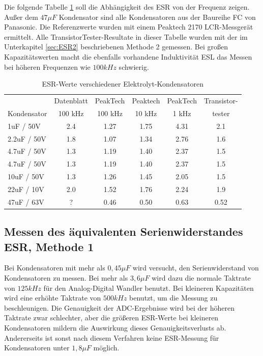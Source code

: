 Die folgende Tabelle \ref{tab:capESR} soll die Abhängigkeit des ESR von der Frequenz zeigen.
Außer dem \(47\mu F\) Kondensator sind alle Kondensatoren aus der Baureihe FC von Panasonic.
Die Referenzwerte wurden mit einem Peaktech 2170 LCR-Messgerät ermittelt.
Alle TransistorTester-Resultate in dieser Tabelle wurden mit der im Unterkapitel \ref{sec:ESR2} 
beschriebenen Methode 2 gemessen.
Bei großen Kapazitätswerten macht die ebenfalls vorhandene Induktivität ESL das Messen bei höheren Frequenzen 
wie \(100kHz\) schwierig.


\begin{table}[H]
  \begin{center}
    \begin{tabular}{| l | c | c | c | c | c |}
   \hline
            & Datenblatt & PeakTech  & Peaktech & PeakTech & Transistor- \\
Kondensator & 100 kHz    & 100 kHz   & 10 kHz   & 1 kHz    & tester  \\
    \hline
    \hline
1uF / 50V    & 2.4       & 1.27      & 1.75     & 4.31     &  2.1 \\
    \hline
2.2uF / 50V  & 1.8       & 1.07      & 1.34     & 2.76     &  1.6 \\
    \hline
4.7uF / 50V  & 1.3       & 1.19      & 1.40     & 2.37     &  1.5 \\
    \hline
4.7uF / 50V  & 1.3       & 1.19      & 1.40     & 2.37     &  1.5 \\
    \hline
10uF / 50V   & 1.3       & 1.26      & 1.45     & 2.05     &  1.5 \\
    \hline
22uF / 10V   & 2.0       & 1.52      & 1.76     & 2.24     &  1.9 \\
    \hline
47uF / 63V   & ?         & 0.46      & 0.50     & 0.63     &  0.52 \\
    \hline
    \end{tabular}
  \end{center}
  \caption{ESR-Werte verschiedener Elektrolyt-Kondensatoren}
  \label{tab:capESR} 
\end{table}


\subsection{Messen des äquivalenten Serienwiderstandes ESR, Methode 1}
Bei Kondensatoren mit mehr als \(0,45\mu F\) wird versucht, den Serienwiderstand von Kondensatoren zu messen.
Bei mehr als \(3,6\mu F\) wird dazu die normale Taktrate von \(125kHz\) für den Analog-Digital Wandler benutzt.
Bei kleineren Kapazitäten wird eine erhöhte Taktrate von \(500kHz\) benutzt, um die Messung zu beschleunigen.
Die Genauigkeit der ADC-Ergebnisse wird bei der höheren Taktrate zwar schlechter, aber die größeren ESR-Werte
bei kleineren Kondensatoren mildern die Auswirkung dieses Genauigkeitsverlusts ab. 
Andererseits ist sonst nach diesem Verfahren keine ESR-Messung für Kondensatoren unter \(1,8\mu F\) möglich.

